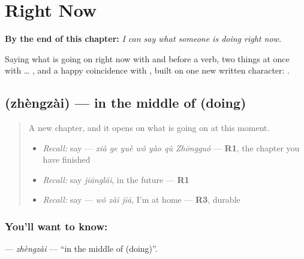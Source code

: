 
\chapter{Right Now}
\label{ch:zh-right-now}

\begin{chapteropening}
\textbf{By the end of this chapter:} \emph{I can say what someone is doing right now.}

Saying what is going on right now with  and  before a verb, two things at once with  … , and a happy coincidence with , built on one new written character: .
\end{chapteropening}

\section[\texorpdfstring{\zh{正在} (zhèngzài)}{正在 (zhèngzài)}]{ (zhèngzài) — in the middle of (doing)}

\label{lesson:ZH-C149-zhengzai}



\begin{quote}
A new chapter, and it opens on what is going on at this moment.

\begin{itemize}
\raggedright
  \item \emph{Recall:} say  — \emph{xià ge yuè wǒ yào qù Zhōngguó} — \textbf{R1}, the chapter you have finished
  \item \emph{Recall:} say \emph{jiānglái}, in the future — \textbf{R1}
  \item \emph{Recall:} say  — \emph{wǒ zài jiā}, I'm at home — \textbf{R3}, durable
\end{itemize}
\end{quote}

\subsection*{You'll want to know: }
\textbf{} — \emph{zhèngzài} — \textquotedblleft{}in the middle of (doing)\textquotedblright{}.

